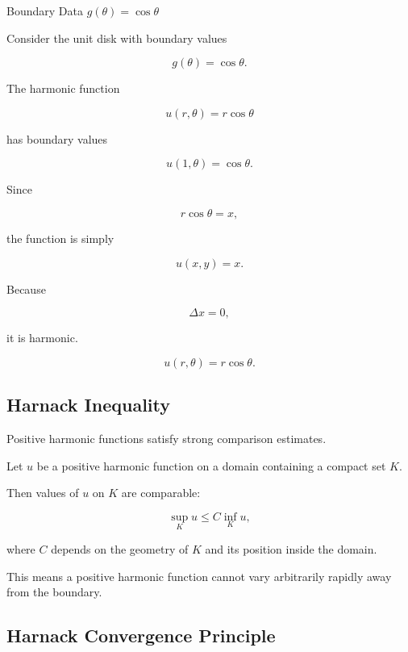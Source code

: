 \begin{workedexamplebox}{Boundary Data \(g(\theta)=\cos\theta\)}

Consider the unit disk with boundary values

\[
g(\theta)=\cos\theta.
\]

The harmonic function

\[
u(r,\theta)=r\cos\theta
\]

has boundary values

\[
u(1,\theta)=\cos\theta.
\]

Since

\[
r\cos\theta=x,
\]

the function is simply

\[
u(x,y)=x.
\]

Because

\[
\Delta x=0,
\]

it is harmonic.

\begin{answerbox}
\[
\boxed{
u(r,\theta)=r\cos\theta.
}
\]
\end{answerbox}

\end{workedexamplebox}

\subsection{Harnack Inequality}
\label{subsec:harnack-inequality}

Positive harmonic functions satisfy strong comparison estimates.

\begin{theorem}
Let \(u\) be a positive harmonic function on a domain containing a compact
set \(K\).

Then values of \(u\) on \(K\) are comparable:

\[
\boxed{
\sup_Ku
\leq
C\inf_Ku,
}
\]

where \(C\) depends on the geometry of \(K\) and its position inside the
domain.
\end{theorem}

This means a positive harmonic function cannot vary arbitrarily rapidly
away from the boundary.

\subsection{Harnack Convergence Principle}
\label{subsec:harnack-convergence}

